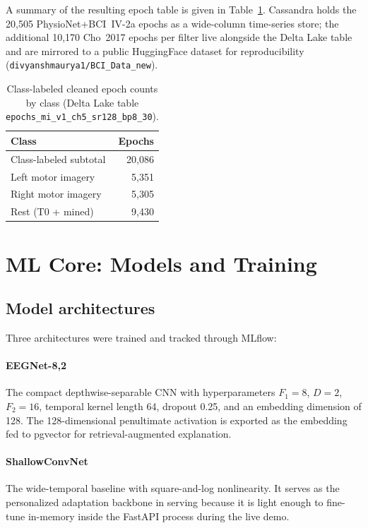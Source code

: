 \documentclass[conference]{IEEEtran}
\begin{document}
A summary of the resulting epoch table is given in Table~\ref{tab:epochs}.
Cassandra holds the 20{,}505 PhysioNet+BCI~IV-2a epochs as a wide-column
time-series store; the additional 10{,}170 Cho~2017 epochs per filter live
alongside the Delta Lake table and are mirrored to a public HuggingFace
dataset for reproducibility (\texttt{divyanshmaurya1/BCI\_Data\_new}).

\begin{table}[!t]
\caption{Class-labeled cleaned epoch counts by class (Delta Lake table
\texttt{epochs\_mi\_v1\_ch5\_sr128\_bp8\_30}).}
\label{tab:epochs}
\centering
\renewcommand{\arraystretch}{1.15}
\begin{tabular}{l r}
\toprule
\textbf{Class} & \textbf{Epochs} \\
\midrule
Class-labeled subtotal & 20{,}086 \\
Left motor imagery     &  5{,}351 \\
Right motor imagery    &  5{,}305 \\
Rest (T0 + mined)      &  9{,}430 \\
\bottomrule
\end{tabular}
\end{table}

\section{ML Core: Models and Training}

\subsection{Model architectures}

Three architectures were trained and tracked through MLflow:

\paragraph{EEGNet-8,2~\cite{ref:lawhern2018}} The compact depthwise-separable
CNN with hyperparameters $F_1=8$, $D=2$, $F_2=16$, temporal kernel length 64,
dropout 0.25, and an embedding dimension of 128. The 128-dimensional
penultimate activation is exported as the embedding fed to pgvector for
retrieval-augmented explanation.

\paragraph{ShallowConvNet~\cite{ref:schirrmeister2017}} The wide-temporal
baseline with square-and-log nonlinearity. It serves as the personalized
adaptation backbone in serving because it is light enough to fine-tune
in-memory inside the FastAPI process during the live demo.
\end{document}
